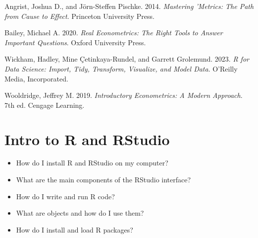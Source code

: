\documentclass[
  letterpaper,
  DIV=11,
  numbers=noendperiod]{scrreprt}
\newlength{\cslhangindent}
\newenvironment{CSLReferences}[2] %
 {\begin{list}{}{%
  \setlength{\itemindent}{0pt}
  \setlength{\leftmargin}{0pt}
  \setlength{\parsep}{0pt}
  \ifodd #1
   \setlength{\leftmargin}{\cslhangindent}
   \setlength{\itemindent}{-1\cslhangindent}
  \fi
  \setlength{\itemsep}{#2\baselineskip}}}
 {\end{list}}
\providecommand{\tightlist}{%
  \setlength{\itemsep}{0pt}\setlength{\parskip}{0pt}}
\begin{document}

\protect{}\label{refs}
\begin{CSLReferences}{1}{1}
Angrist, Joshua D., and Jörn-Steffen Pischke. 2014. \emph{Mastering
'Metrics: The Path from Cause to Effect}. Princeton University Press.

Bailey, Michael A. 2020. \emph{Real Econometrics: The Right Tools to
Answer Important Questions}. Oxford University Press.

Wickham, Hadley, Mine Çetinkaya-Rundel, and Garrett Grolemund. 2023.
\emph{R for Data Science: Import, Tidy, Transform, Visualize, and Model
Data}. O'Reilly Media, Incorporated.

Wooldridge, Jeffrey M. 2019. \emph{Introductory Econometrics: A Modern
Approach}. 7th ed. Cengage Learning.

\end{CSLReferences}

\cleardoublepage
{}
{}
\appendix

\chapter{Intro to R and RStudio}\label{sec-installingR}

\begin{tcolorbox}[enhanced jigsaw, arc=.35mm, bottomrule=.15mm, bottomtitle=1mm, breakable, colback=white, colbacktitle=quarto-callout-tip-color!10!white, colframe=quarto-callout-tip-color-frame, coltitle=black, left=2mm, leftrule=.75mm, opacityback=0, opacitybacktitle=0.6, rightrule=.15mm, title=\textcolor{quarto-callout-tip-color}{\faLightbulb}\hspace{0.5em}{\textbf{Key Questions}}, titlerule=0mm, toprule=.15mm, toptitle=1mm]

\begin{itemize}
\tightlist
\item
  How do I install R and RStudio on my computer?
\item
  What are the main components of the RStudio interface?
\item
  How do I write and run R code?
\item
  What are objects and how do I use them?
\item
  How do I install and load R packages?
\end{itemize}

\end{tcolorbox}
\end{document}
